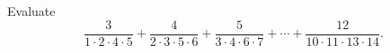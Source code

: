 Evaluate
\[
\dfrac{3}{1\cdot2\cdot4\cdot5}+\dfrac{4}{2\cdot3\cdot5\cdot6}+\dfrac{5}{3\cdot4\cdot6\cdot7}+\cdots+\dfrac{12}{10\cdot11\cdot13\cdot14}.
\]
